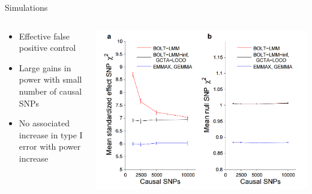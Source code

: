 \documentclass[aspectratio=169]{beamer}\usepackage[]{graphicx}\usepackage[]{color}
\begin{document}
\begin{frame}{Simulations}
\begin{columns}[onlytextwidth]
\begin{column}{0.5\textwidth}
\begin{itemize}
\item Effective false positive control
\item Large gains in power with small number of causal SNPs
\item No associated increase in type I error with power increase
\end{itemize}
\end{column}
\begin{column}{0.5\textwidth}
\includegraphics[scale=.25]{./figure/FalsePositiveControl.png}
\end{column}
\end{columns}
\end{frame}
\end{document}
